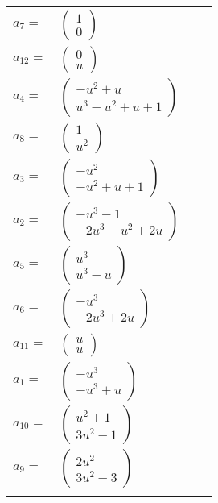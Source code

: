 \documentclass[1p]{elsarticle_modified}
\theoremstyle{definition}
\begin{document}
\begin{tabular}{m{7pt} m{180pt} m{7pt} m{180pt} }
\flushright $a_{7}=$&$\begin{pmatrix}1\\0\end{pmatrix}$ \\
\flushright $a_{12}=$&$\begin{pmatrix}0\\u\end{pmatrix}$ \\
\flushright $a_{4}=$&$\begin{pmatrix}- u^2+u\\u^3- u^2+u+1\end{pmatrix}$ \\
\flushright $a_{8}=$&$\begin{pmatrix}1\\u^2\end{pmatrix}$ \\
\flushright $a_{3}=$&$\begin{pmatrix}- u^2\\- u^2+u+1\end{pmatrix}$ \\
\flushright $a_{2}=$&$\begin{pmatrix}- u^3-1\\-2 u^3- u^2+2 u\end{pmatrix}$ \\
\flushright $a_{5}=$&$\begin{pmatrix}u^3\\u^3- u\end{pmatrix}$ \\
\flushright $a_{6}=$&$\begin{pmatrix}- u^3\\-2 u^3+2 u\end{pmatrix}$ \\
\flushright $a_{11}=$&$\begin{pmatrix}u\\u\end{pmatrix}$ \\
\flushright $a_{1}=$&$\begin{pmatrix}- u^3\\- u^3+u\end{pmatrix}$ \\
\flushright $a_{10}=$&$\begin{pmatrix}u^2+1\\3 u^2-1\end{pmatrix}$ \\
\flushright $a_{9}=$&$\begin{pmatrix}2 u^2\\3 u^2-3\end{pmatrix}$\\&\end{tabular}
\end{document}
